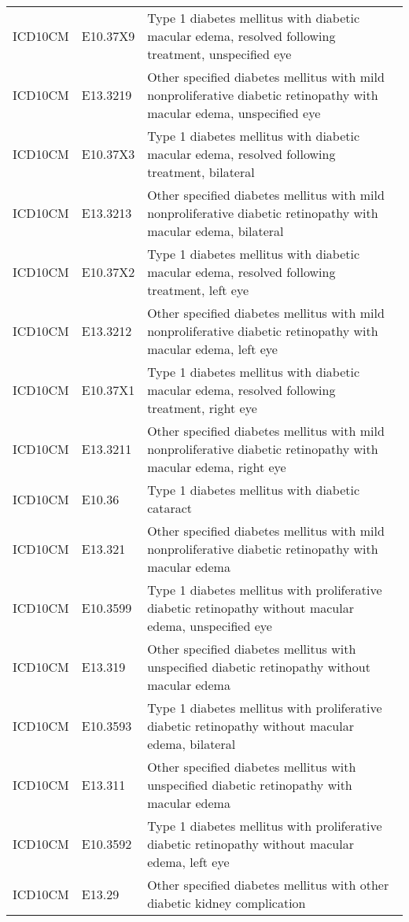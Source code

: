 \begin{table}[ht]
\begin{tabular}{lll}
  ICD10CM & E10.37X9 & Type 1 diabetes mellitus with diabetic macular edema, resolved following treatment, unspecified eye \\ 
  ICD10CM & E13.3219 & Other specified diabetes mellitus with mild nonproliferative diabetic retinopathy with macular edema, unspecified eye \\ 
  ICD10CM & E10.37X3 & Type 1 diabetes mellitus with diabetic macular edema, resolved following treatment, bilateral \\ 
  ICD10CM & E13.3213 & Other specified diabetes mellitus with mild nonproliferative diabetic retinopathy with macular edema, bilateral \\ 
  ICD10CM & E10.37X2 & Type 1 diabetes mellitus with diabetic macular edema, resolved following treatment, left eye \\ 
  ICD10CM & E13.3212 & Other specified diabetes mellitus with mild nonproliferative diabetic retinopathy with macular edema, left eye \\ 
  ICD10CM & E10.37X1 & Type 1 diabetes mellitus with diabetic macular edema, resolved following treatment, right eye \\ 
  ICD10CM & E13.3211 & Other specified diabetes mellitus with mild nonproliferative diabetic retinopathy with macular edema, right eye \\ 
  ICD10CM & E10.36 & Type 1 diabetes mellitus with diabetic cataract \\ 
  ICD10CM & E13.321 & Other specified diabetes mellitus with mild nonproliferative diabetic retinopathy with macular edema \\ 
  ICD10CM & E10.3599 & Type 1 diabetes mellitus with proliferative diabetic retinopathy without macular edema, unspecified eye \\ 
  ICD10CM & E13.319 & Other specified diabetes mellitus with unspecified diabetic retinopathy without macular edema \\ 
  ICD10CM & E10.3593 & Type 1 diabetes mellitus with proliferative diabetic retinopathy without macular edema, bilateral \\ 
  ICD10CM & E13.311 & Other specified diabetes mellitus with unspecified diabetic retinopathy with macular edema \\ 
  ICD10CM & E10.3592 & Type 1 diabetes mellitus with proliferative diabetic retinopathy without macular edema, left eye \\ 
  ICD10CM & E13.29 & Other specified diabetes mellitus with other diabetic kidney complication \\ 

\end{tabular}
\end{table}
